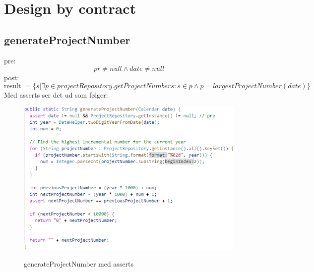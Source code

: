 \section{Design by contract}

\subsection{generateProjectNumber}
pre: 
\begin{equation}
    pr \neq null \land date \neq null
\end{equation}
post:
\begin{equation}
    \text{result }=\{s|\exists p \in projectRepository.getProjectNumbers : s \in p \land p = largestProjectNumber(date)\}
\end{equation}
Med asserts ser det ud som følger:
\begin{figure}[H]
    \centering
    \caption{generateProjectNumber med asserts}
    \includegraphics[width = 14cm, keepaspectratio]{ImplementationAndTest/Diagrams/contract_generateProjectNumber.png}
    \label{fig:contract_generateProjectNumber}
\end{figure}

